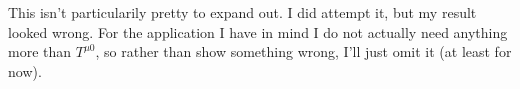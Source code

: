 This isn't particularily pretty to expand out.  I did attempt it, but my result looked wrong.  For the application I have in mind I do not actually need anything more than $T^{\mu 0}$, so rather than show something wrong, I'll just omit it (at least for now).
%
%
%
%
%
